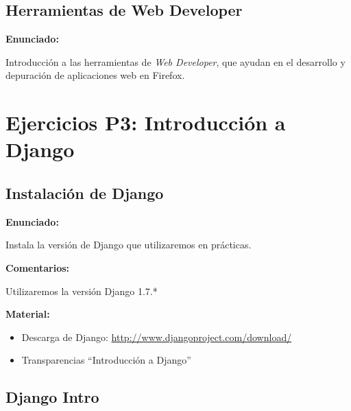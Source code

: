 \subsection{Herramientas de Web Developer}
\label{subsec:inst-web-developer}

\textbf{Enunciado:}

Introducción a las herramientas de \emph{Web Developer}, que ayudan en el desarrollo
y depuración de aplicaciones web en Firefox.

\section{Ejercicios P3: Introducción a Django}

\subsection{Instalación de Django}
\label{subsec:django-install}

\textbf{Enunciado:}

Instala la versión de Django que utilizaremos en prácticas.

\textbf{Comentarios:}

Utilizaremos la versión Django 1.7.*

\textbf{Material:}

\begin{itemize}
\item Descarga de Django: \url{http://www.djangoproject.com/download/}
\item Transparencias ``Introducción a Django''
\end{itemize}


\subsection{Django Intro}
\label{subsec:django-intro}

